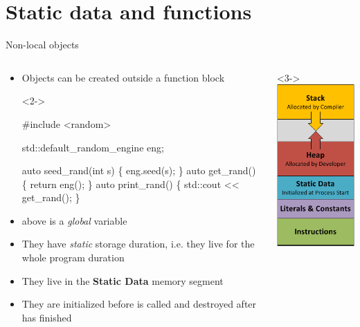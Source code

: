 

\section*{Static data and functions}

\begin{frame}[fragile]{Non-local objects}

  \begin{columns}
    \begin{column}{.75\textwidth}
      \begin{itemize}
      \item Objects can be created outside a function block
        \begin{codeblock}<2->{
#include <random>

std::default_random_engine eng;

auto seed_rand(int s) \{ eng.seed(s); \}
auto get_rand()       \{ return eng(); \}
auto print_rand()     \{ std::cout << get_rand(); \}}\end{codeblock}

      \item<2->  above is a \textit{global} variable
      \item<3-> They have \textit{static} storage duration, i.e. they live for the
        whole program duration
      \item<3-> They live in the \textbf{Static Data} memory segment
      \item<4-> They are initialized before  is called and destroyed
        after  has finished
      \end{itemize}

    \end{column}
    \begin{column}{.25\textwidth}<3->
      \centering\includegraphics[height=.5\textheight]{images/process-memory-layout}
    \end{column}
  \end{columns}
\end{frame}

